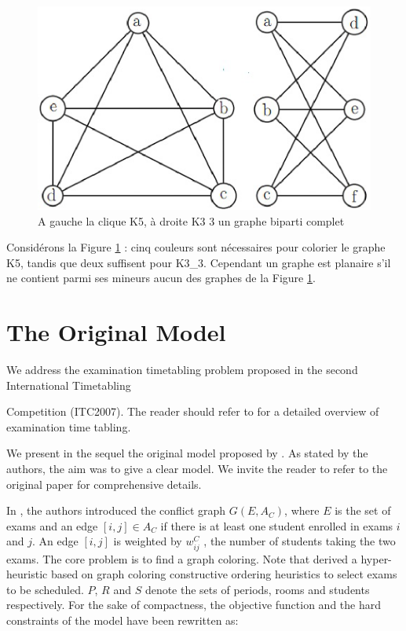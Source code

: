 \documentclass[a4paper, french, 8pt]{report}
\newenvironment{changemargin}{\begin{list}{}{
\setlength{\rightmargin}{-1.5cm}
\setlength{\leftmargin}{0.5cm}
}\item }{\end{list}}
\begin{document}
\begin{figure}[!h]
    \centering
    \includegraphics[scale=0.5]{K5_K3_3_Graph.eps}
    \caption{A gauche la clique K5, à droite K3 3 un graphe biparti complet}
    \label{graph}
\end{figure}

Considérons la Figure \ref{graph} : cinq couleurs sont nécessaires pour colorier le graphe K5, tandis que deux suffisent pour K3\_3. Cependant un graphe est planaire s’il ne contient parmi ses mineurs aucun des graphes de la Figure \ref{graph}.

\section{The Original Model}
\label{section5}

\begin{changemargin}We address the examination timetabling problem proposed in the second International Timetabling\end{changemargin}Competition (ITC2007). The reader should refer to \cite{burke1997automated} for a detailed overview of examination time tabling.

We present in the sequel the original model proposed by \cite{springerlink:10.1007/s10479-011-0997-x}. As stated by the authors, the aim was to give a clear model. We invite the reader to refer to the original paper for comprehensive details.

In \cite{springerlink:10.1007/s10479-011-0997-x}, the authors introduced the conflict graph $G(E, A_C )$, where $E$ is the set of exams and an edge $[i, j] \in A_C$ if there is at least one student enrolled in exams $i$ and $j$. An edge $[i, j]$ is weighted by $w^C_{ij}$ , the number of students taking the two exams. The core problem is to find a graph coloring. Note that \cite{sabar2012graph} derived a hyper-heuristic based on graph coloring constructive ordering heuristics to select exams to be scheduled. $P$, $R$ and $S$ denote the sets of periods, rooms and students respectively. For the sake of compactness, the objective function and the hard constraints of the model have been rewritten as:
\end{document}
